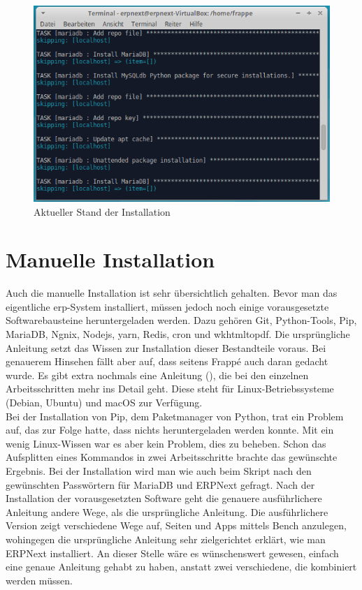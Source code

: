 \begin{figure}[H]
  \centering
  \includegraphics[width=\textwidth]{Bilder/Aktueller_Stand_Installation.PNG}
  \caption{Aktueller Stand der Installation}
  \label{fig:aktInst}
\end{figure}

\section{Manuelle Installation}
Auch die manuelle Installation ist sehr übersichtlich gehalten. Bevor man das eigentliche \gls{erp}-System installiert, müssen jedoch noch einige vorausgesetzte Softwarebausteine heruntergeladen werden. Dazu gehören Git, Python-Tools, Pip, MariaDB, Ngnix, Nodejs, yarn, Redis, cron und wkhtmltopdf. Die ursprüngliche Anleitung setzt das Wissen zur Installation dieser Bestandteile voraus. Bei genauerem Hinsehen fällt aber auf, dass seitens Frappé auch daran gedacht wurde. Es gibt extra nochmals eine Anleitung (\vgl \cite{GhGuide}), die bei den einzelnen Arbeitsschritten mehr ins Detail geht. Diese steht für Linux-Betriebssysteme (Debian, Ubuntu) und macOS zur Verfügung. \\
Bei der Installation von Pip, dem Paketmanager von Python, trat ein Problem auf, das zur Folge hatte, dass nichts heruntergeladen werden konnte. Mit ein wenig Linux-Wissen war es aber kein Problem, dies zu beheben. Schon das Aufsplitten eines Kommandos in zwei Arbeitsschritte brachte das gewünschte Ergebnis. Bei der Installation wird man wie auch beim Skript nach den gewünschten Passwörtern für MariaDB und ERPNext gefragt.
Nach der Installation der vorausgesetzten Software geht die genauere ausführlichere Anleitung andere Wege, als die ursprüngliche Anleitung.
Die ausführlichere Version zeigt verschiedene Wege auf, Seiten und Apps mittels Bench anzulegen, wohingegen die ursprüngliche Anleitung sehr zielgerichtet erklärt, wie man ERPNext installiert. An dieser Stelle wäre es wünschenswert gewesen, einfach eine genaue Anleitung gehabt zu haben, anstatt zwei verschiedene, die kombiniert werden müssen.

